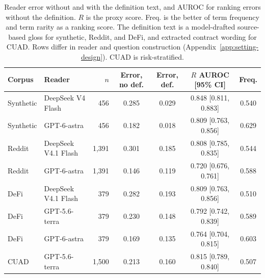 \begin{table}[t]\centering\footnotesize\setlength{\tabcolsep}{4pt}
\caption{Reader error without and with the definition text, and AUROC for ranking errors without the definition. $R$ is the proxy score. Freq. is the better of term frequency and term rarity as a ranking score. The definition text is a model-drafted source-based gloss for synthetic, Reddit, and DeFi, and extracted contract wording for CUAD. Rows differ in reader and question construction (Appendix~\ref{app:setting-design}). CUAD is risk-stratified.}
\label{tab:prediction}
\begin{tabular}{@{}llrcccc@{}}\toprule
Corpus & Reader & $n$ & Error, no def. & Error, def. & $R$ AUROC [95\% CI] & Freq.\\\midrule
Synthetic & DeepSeek V4 Flash & 456 & 0.285 & 0.029 & 0.848 [0.811, 0.883] & 0.540\\
Synthetic & GPT-6-astra & 456 & 0.182 & 0.018 & 0.809 [0.763, 0.856] & 0.629\\
Reddit & DeepSeek V4.1 Flash & 1,391 & 0.301 & 0.185 & 0.808 [0.785, 0.835] & 0.544\\
Reddit & GPT-6-astra & 1,391 & 0.146 & 0.119 & 0.720 [0.676, 0.761] & 0.588\\
DeFi & DeepSeek V4.1 Flash & 379 & 0.282 & 0.193 & 0.809 [0.763, 0.856] & 0.510\\
DeFi & GPT-5.6-terra & 379 & 0.230 & 0.148 & 0.792 [0.742, 0.839] & 0.589\\
DeFi & GPT-6-astra & 379 & 0.169 & 0.135 & 0.764 [0.704, 0.815] & 0.603\\
CUAD & GPT-5.6-terra & 1,500 & 0.213 & 0.160 & 0.815 [0.789, 0.840] & 0.507\\
\bottomrule\end{tabular}\end{table}